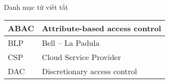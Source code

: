 \begin{preface}{Danh mục từ viết tắt}

    \begin{tabular}{| p{} |p{} |}
    \hline
         ABAC &  Attribute-based access control\\
         \hline
         BLP & Bell – La Padula \\
         \hline
         CSP & Cloud Service Provider \\
         \hline
         DAC & Discretionary access control \\
         \hline
    \end{tabular} \\
\end{preface}

